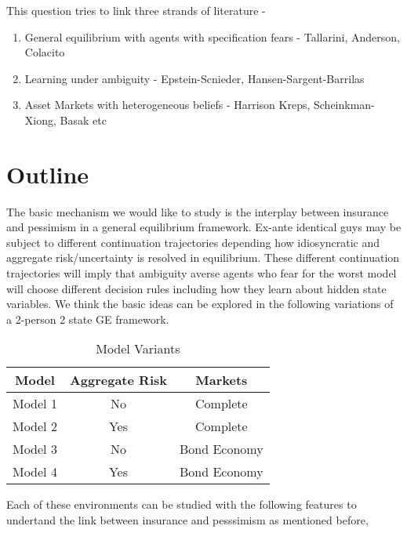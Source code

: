 \documentclass[a4paper,12pt]{article}
\begin{document}
\noindent This question tries to link three strands of literature -
\begin{enumerate}
	\item General equilibrium with agents with specification fears - Tallarini, Anderson, Colacito
	\item Learning under ambiguity - Epstein-Scnieder, Hansen-Sargent-Barrilas
	\item Asset Markets with heterogeneous beliefs - Harrison Kreps, Scheinkman-Xiong, Basak etc
\end{enumerate}
\section{Outline}
The basic mechanism we would like to study is the interplay between insurance and pessimism in a general equilibrium framework. Ex-ante identical guys may be subject to different continuation trajectories depending how idiosyncratic and aggregate risk/uncertainty is resolved in equilibrium. These different continuation trajectories will imply that ambiguity averse agents who fear for the worst model will choose different decision rules including how they learn about hidden state variables. We think the basic ideas can be explored in the following variations of a 2-person 2 state GE framework.

\begin{table}
  \centering
  \begin{tabular}{|c | c |c |}
\hline
    Model   & Aggregate Risk & Markets \\ \hline \hline
    Model 1 & No  & Complete  \\
    Model 2 & Yes & Complete   \\
    Model 3 & No & Bond Economy  \\ 
    Model 4 & Yes & Bond Economy  \\ \hline
 \end{tabular}
  \caption{Model Variants}
  \label{tab:ModVar}
\end{table}

Each of these environments can be studied with the following features to undertand the link between insurance and pesssimism as mentioned before,
\end{document}
